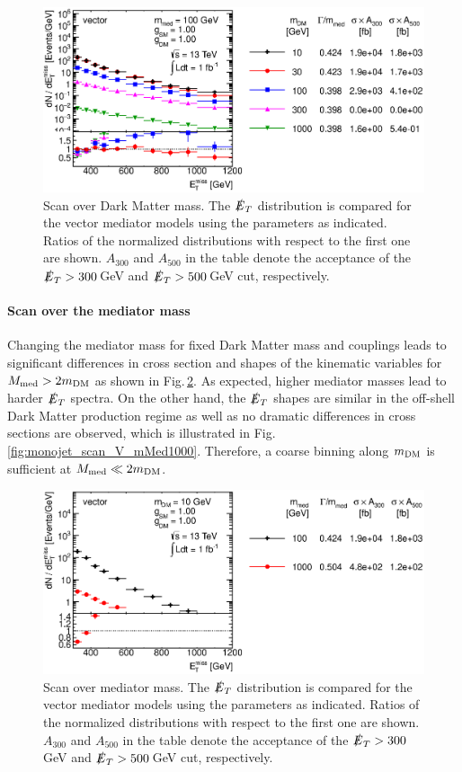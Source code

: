 \begin{figure}
\centering
\includegraphics[width=0.9\linewidth]{figures/monojet/scan_mDM_V_100.eps}
\caption{Scan over Dark Matter mass. The $\slashed{E}_T$ distribution is compared for the vector mediator models using the parameters as indicated. Ratios of the normalized distributions with respect to the first one are shown. $A_{300}$ and $A_{500}$ in the table denote the acceptance of the $\slashed{E}_T>300$\,GeV and $\slashed{E}_T>500$\,GeV cut, respectively.}
\label{fig:monojet_scan_V_mDM100}
\end{figure}


\paragraph{Scan over the mediator mass}

Changing the mediator mass for fixed Dark Matter mass and couplings leads to significant differences in cross section and shapes of the kinematic variables for $M_{\rm{med}}>2m_{\rm{DM}}$ as shown in Fig.\,\ref{fig:monojet_scan_V_mMed10}. As expected, higher mediator masses lead to harder $\slashed{E}_T$ spectra.
On the other hand, the $\slashed{E}_T$ shapes are similar in the off-shell Dark Matter production regime as well as no dramatic differences in cross sections are observed, which is illustrated in Fig.\,\ref{fig:monojet_scan_V_mMed1000}. Therefore, a coarse binning along $m_{\rm{DM}}$ is sufficient at $M_{\rm{med}} \ll 2m_{\rm{DM}}$.

\begin{figure}
\centering
\includegraphics[width=0.9\linewidth]{figures/monojet/scan_mMed_V_10.eps}
\caption{Scan over mediator mass. The $\slashed{E}_T$ distribution is compared for the vector mediator models using the parameters as indicated. Ratios of the normalized distributions with respect to the first one are shown. $A_{300}$ and $A_{500}$ in the table denote the acceptance of the $\slashed{E}_T>300$\,GeV and $\slashed{E}_T>500$\,GeV cut, respectively.}
\label{fig:monojet_scan_V_mMed10}
\end{figure}

